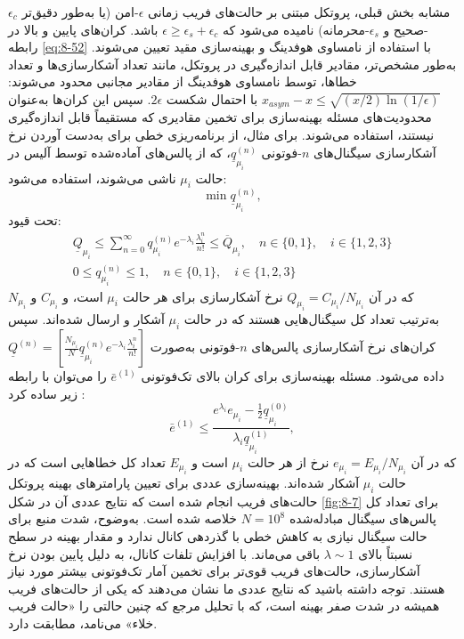 مشابه بخش قبلی، پروتکل  مبتنی بر حالت‌های فریب زمانی $\epsilon$-امن (یا به‌طور دقیق‌تر $\epsilon_c$-صحیح و $\epsilon_s$-محرمانه) نامیده می‌شود که $\epsilon \geq \epsilon_s + \epsilon_c$ باشد. کران‌های پایین و بالا در رابطه \eqref{eq:8-52} با استفاده از نامساوی هوفدینگ \cite{8-52} و بهینه‌سازی مقید تعیین می‌شوند. به‌طور مشخص‌تر، مقادیر قابل اندازه‌گیری در پروتکل، مانند تعداد آشکارسازی‌ها و تعداد خطاها، توسط نامساوی هوفدینگ از مقادیر مجانبی محدود می‌شوند: $x_{asym} - x \leq \sqrt{(x/2) \ln(1/\epsilon)}$ با احتمال شکست $2\epsilon$. سپس این کران‌ها به‌عنوان محدودیت‌های مسئله بهینه‌سازی برای تخمین مقادیری که مستقیماً قابل اندازه‌گیری نیستند، استفاده می‌شوند. برای مثال، از برنامه‌ریزی خطی برای به‌دست آوردن نرخ آشکارسازی سیگنال‌های $n$-فوتونی $\underline{q}_{\mu_i}^{(n)}$، که از پالس‌های آماده‌شده توسط آلیس در حالت $\mu_i$ ناشی می‌شوند، استفاده می‌شود:
\begin{equation}
	\min \underline{q}_{\mu_i}^{(n)},
	\label{eq:8-54}
\end{equation}
تحت قیود:
\begin{equation}
	\begin{aligned}
		\underline{Q}_{\mu_i} \leq \sum_{n=0}^{\infty} q_{\mu_i}^{(n)} e^{-\lambda_i} \frac{\lambda_i^n}{n!} \leq \overline{Q}_{\mu_i}, \quad n \in \{0, 1\}, \quad i \in \{1, 2, 3\} \\
		0 \leq q_{\mu_i}^{(n)} \leq 1, \quad n \in \{0, 1\}, \quad i \in \{1, 2, 3\}
	\end{aligned}
	\label{eq:8-55}
\end{equation}
که در آن $Q_{\mu_i} = C_{\mu_i} / N_{\mu_i}$ نرخ آشکارسازی برای هر حالت $\mu_i$ است، و $C_{\mu_i}$ و $N_{\mu_i}$ به‌ترتیب تعداد کل سیگنال‌هایی هستند که در حالت $\mu_i$ آشکار و ارسال شده‌اند. سپس کران‌های نرخ آشکارسازی پالس‌های $n$-فوتونی به‌صورت $\underline{Q}^{(n)} = \left[ \frac{N_{\mu_i}}{N} \underline{q}_{\mu_i}^{(n)} e^{-\lambda_i} \frac{\lambda_i^n}{n!} \right]$ داده می‌شود. مسئله بهینه‌سازی برای کران بالای  تک‌فوتونی $\bar{e}^{(1)}$ را می‌توان با رابطه زیر ساده کرد \cite{8-53}:
\begin{equation}
	\bar{e}^{(1)} \leq \frac{e^{\lambda_i} e_{\mu_i} - \frac{1}{2} \underline{q}_{\mu_i}^{(0)}}{\lambda_i \underline{q}_{\mu_i}^{(1)}},
	\label{eq:8-56}
\end{equation}
که در آن $e_{\mu_i} = E_{\mu_i} / N_{\mu_i}$ نرخ  از هر حالت $\mu_i$ است و $E_{\mu_i}$ تعداد کل خطاهایی است که در حالت $\mu_i$ آشکار شده‌اند. بهینه‌سازی عددی برای تعیین پارامترهای بهینه پروتکل حالت‌های فریب انجام شده است که نتایج عددی آن در شکل \ref{fig:8-7} برای تعداد کل پالس‌های سیگنال مبادله‌شده $N = 10^8$ خلاصه شده است. به‌وضوح، شدت منبع برای حالت سیگنال نیازی به کاهش خطی با گذردهی کانال ندارد و مقدار بهینه در سطح نسبتاً بالای $\lambda \sim 1$ باقی می‌ماند. با افزایش تلفات کانال، به دلیل پایین بودن نرخ آشکارسازی، حالت‌های فریب قوی‌تر برای تخمین آمار تک‌فوتونی بیشتر مورد نیاز هستند. توجه داشته باشید که نتایج عددی ما نشان می‌دهند که یکی از حالت‌های فریب همیشه در شدت صفر بهینه است، که با تحلیل مرجع \cite{8-54} که چنین حالتی را «حالت فریب خلاء» می‌نامد، مطابقت دارد.
